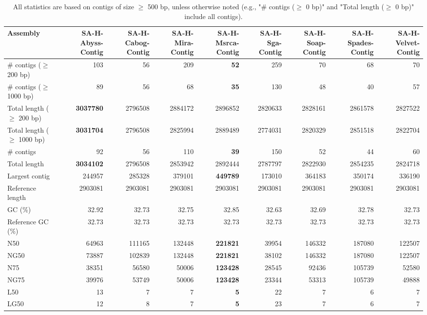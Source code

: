 \documentclass[12pt,a4paper]{article}
\begin{document}
\begin{table}[ht]
\begin{center}
\caption{All statistics are based on contigs of size $\geq$ 500 bp, unless otherwise noted (e.g., "\# contigs ($\geq$ 0 bp)" and "Total length ($\geq$ 0 bp)" include all contigs).}
\begin{tabular}{|l*{8}{|r}|}
\hline
Assembly & SA-H-Abyss-Contig & SA-H-Cabog-Contig & SA-H-Mira-Contig & SA-H-Msrca-Contig & SA-H-Sga-Contig & SA-H-Soap-Contig & SA-H-Spades-Contig & SA-H-Velvet-Contig \\ \hline
\# contigs ($\geq$ 200 bp) & 103 & 56 & 209 & {\bf 52} & 259 & 70 & 68 & 70 \\ \hline
\# contigs ($\geq$ 1000 bp) & 89 & 56 & 68 & {\bf 35} & 130 & 48 & 40 & 57 \\ \hline
Total length ($\geq$ 200 bp) & {\bf 3037780} & 2796508 & 2884172 & 2896852 & 2820633 & 2828161 & 2861578 & 2827522 \\ \hline
Total length ($\geq$ 1000 bp) & {\bf 3031704} & 2796508 & 2825994 & 2889489 & 2774031 & 2820329 & 2851518 & 2822704 \\ \hline
\# contigs & 92 & 56 & 110 & {\bf 39} & 150 & 52 & 44 & 60 \\ \hline
Total length & {\bf 3034102} & 2796508 & 2853942 & 2892444 & 2787797 & 2822930 & 2854235 & 2824718 \\ \hline
Largest contig & 244957 & 285328 & 379101 & {\bf 449789} & 173010 & 364183 & 350174 & 336190 \\ \hline
Reference length & 2903081 & 2903081 & 2903081 & 2903081 & 2903081 & 2903081 & 2903081 & 2903081 \\ \hline
GC (\%) & 32.92 & 32.73 & 32.75 & 32.85 & 32.63 & 32.69 & 32.78 & 32.73 \\ \hline
Reference GC (\%) & 32.73 & 32.73 & 32.73 & 32.73 & 32.73 & 32.73 & 32.73 & 32.73 \\ \hline
N50 & 64963 & 111165 & 132448 & {\bf 221821} & 39954 & 146332 & 187080 & 122507 \\ \hline
NG50 & 73887 & 102839 & 132448 & {\bf 221821} & 38102 & 146332 & 187080 & 122507 \\ \hline
N75 & 38351 & 56580 & 50006 & {\bf 123428} & 28545 & 92436 & 105739 & 52580 \\ \hline
NG75 & 39976 & 53749 & 50006 & {\bf 123428} & 23344 & 53313 & 105739 & 49888 \\ \hline
L50 & 13 & 7 & 7 & {\bf 5} & 22 & 7 & 6 & 7 \\ \hline
LG50 & 12 & 8 & 7 & {\bf 5} & 23 & 7 & 6 & 7 \\ \hline

\end{tabular}
\end{center}
\end{table}
\end{document}
